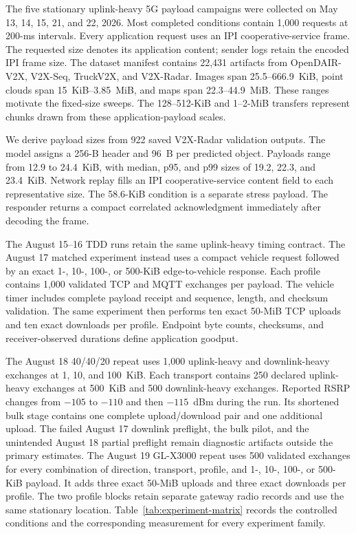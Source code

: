 The five stationary uplink-heavy 5G payload campaigns were collected on May 13, 14, 15, 21,
and 22, 2026. Most completed conditions contain 1,000 requests at 200-ms
intervals. Every application request uses an IPI cooperative-service frame.
The requested size denotes its application content; sender logs retain the encoded
IPI frame size. The dataset manifest contains 22,431 artifacts from
OpenDAIR-V2X, V2X-Seq, TruckV2X, and V2X-Radar. Images span 25.5--666.9~KiB,
point clouds span 15~KiB--3.85~MiB, and maps span 22.3--44.9~MiB. These ranges
motivate the fixed-size sweeps. The 128--512-KiB and 1--2-MiB transfers
represent chunks drawn from these application-payload scales.

We derive payload sizes from 922 saved V2X-Radar validation outputs. The model
assigns a 256-B header and 96~B per predicted object. Payloads range from
12.9 to 24.4~KiB, with median, p95, and p99 sizes of 19.2, 22.3, and
23.4~KiB. Network replay fills an IPI cooperative-service content field to each
representative size. The
58.6-KiB condition is a separate stress payload. The responder returns a
compact correlated acknowledgment immediately after decoding the frame.

The August 15--16 TDD runs retain the same uplink-heavy timing contract. The
August 17 matched experiment instead uses a compact vehicle request followed by
an exact 1-, 10-, 100-, or 500-KiB edge-to-vehicle response. Each profile
contains 1,000 validated TCP and MQTT exchanges per payload. The vehicle timer
includes complete payload receipt and sequence, length, and checksum
validation. The same experiment then performs ten exact 50-MiB TCP
uploads and ten exact downloads per profile. Endpoint byte counts, checksums,
and receiver-observed durations define application goodput.

The August 18 40/40/20 repeat uses 1,000 uplink-heavy and downlink-heavy
exchanges at 1, 10, and 100~KiB. Each transport contains 250 declared
uplink-heavy exchanges at 500~KiB and 500 downlink-heavy exchanges. Reported RSRP
changes from $-105$ to $-110$ and then $-115$~dBm during the run. Its shortened
bulk stage contains one complete upload/download pair and one additional
upload. The failed August 17 downlink preflight, the bulk pilot, and the
unintended August 18 partial preflight remain diagnostic artifacts outside the
primary estimates.
The August 19 GL-X3000 repeat uses 500 validated exchanges for every
combination of direction, transport, profile, and 1-, 10-, 100-, or 500-KiB
payload. It adds three exact 50-MiB uploads and three exact downloads per
profile. The two profile blocks retain separate gateway radio records and use
the same stationary location.
Table~\ref{tab:experiment-matrix} records the controlled conditions and the
corresponding measurement for every experiment family.

